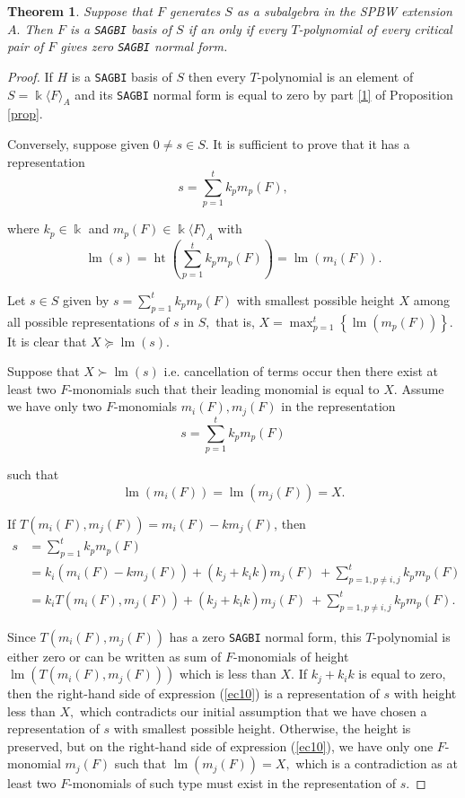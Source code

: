 \documentclass{amsart}
\newtheorem{theorem}{Theorem}[section]
\theoremstyle{definition}
\theoremstyle{remark}
\numberwithin{equation}{section}
\begin{document}
\begin{theorem}\label{sagbicriterio} 
Suppose that $F$ generates $S$ as a subalgebra in the SPBW extension $A.$ Then $F$ is a {\rm {\texttt{SAGBI}}} basis of $S$ if an only if every $T$-polynomial of every critical pair of $F$ gives zero {\rm {\texttt{SAGBI}}} normal form.
\end{theorem}
\begin{proof}
If $H$ is a \texttt{SAGBI} basis of $S$ then every $T$-polynomial is an element of $S=\Bbbk\langle F\rangle_{A}$ and its \texttt{SAGBI} normal form is equal to zero by part \ref{1} of Proposition \ref{prop}.

Conversely, suppose given $0 \neq s \in S .$ It is sufficient to prove that it has a representation 
$$
s = \sum\limits_{p=1}^{t} k_{p} m_{p}(F),
$$ 

where $k_{p} \in \Bbbk$ and $m_{p}(F) \in \Bbbk\langle F\rangle_{A}$ with 
$$
\operatorname{lm}(s)=\operatorname{ht}\left(\sum\limits_{p=1}^{t} k_{p} m_{p}(F)\right)=\operatorname{lm}(m_i(F)).
$$

Let $s \in S$ given by $s = \sum\limits_{p=1}^{t} k_{p} m_{p}(F)$ with smallest possible height $X$ among all possible representations of $s$ in $S,$ that is, $X=\max _{p=1}^{t}\left\{\operatorname{lm}\left(m_{p}(F)\right)\right\}$. It is clear that $ X \succeq\operatorname{lm}(s)$.

Suppose that $X\succ\operatorname{lm}(s)$ i.e. cancellation of terms occur then there exist at least two $F$-monomials such that their leading monomial is equal to $X .$ Assume we have only two $F$-monomials $m_{i}(F), m_{j}(F)$ in the representation 
$$
s = \sum\limits_{p=1}^{t} k_{p} m_{p}(F)
$$ 

such that 
$$
\operatorname{lm}\left(m_{i}(F)\right)=\operatorname{lm}\left(m_{j}(F)\right)=X.
$$ 

If $T\left(m_{i}(F), m_{j}(F)\right)=m_{i}(F)-k m_{j}(F)$, then 
\begin{align}
s &=\sum_{p=1}^{t} k_{p} m_{p}(F) \\
&=k_{i}\left(m_{i}(F)-k m_{j}(F)\right) +\left(k_{j}+k_{i} k\right) m_{j}(F) \ +\sum_{p=1, p \neq i, j}^{t} k_{p} m_{p}(F)\\
&=k_{i} T\left(m_{i}(F), m_{j}(F)\right)+\left(k_{j}+k_{i} k\right) m_{j}(F) \ +\sum_{p=1, p \neq i, j}^{t} k_{p} m_{p}(F).\label{ec10}
\end{align}

Since $T\left(m_{i}(F), m_{j}(F)\right)$ has a zero \texttt{SAGBI} normal form, this $T$-polynomial is either zero or can be written as sum of $F$-monomials of height $\operatorname{lm}\left(T\left(m_{i}(F), m_{j}(F)\right)\right)$ which is less than $X .$ If $k_{j}+k_{i} k$ is equal to zero, then the right-hand side of expression (\ref{ec10}) is a representation of $s$ with height less than $X,$ which contradicts our initial assumption that we have chosen a representation of $s$ with smallest possible height. Otherwise, the height is preserved, but on the right-hand side of expression (\ref{ec10}), we have only one $F$-monomial $m_{j}(F)$ such that $\operatorname{lm}\left(m_{j}(F)\right)=X,$ which is a contradiction as at least two $F$-monomials of such type must exist in the representation of $s$.
\end{proof}
\end{document}
